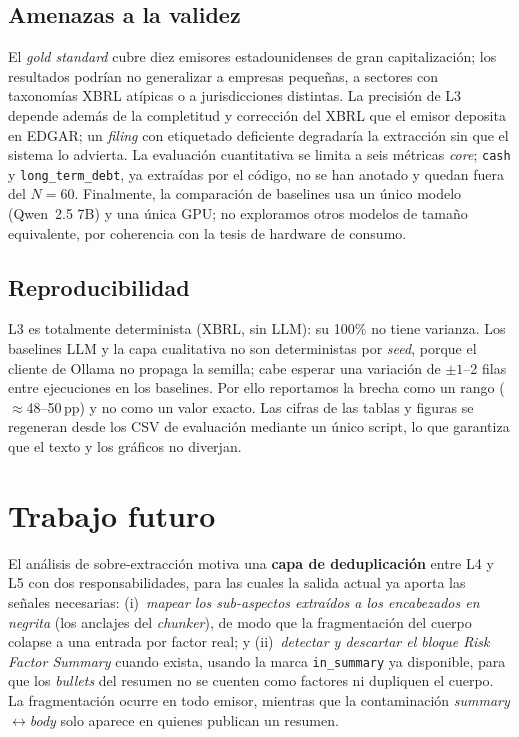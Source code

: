 \documentclass[conference]{IEEEtran}
\begin{document}
\subsection{Amenazas a la validez}
El \textit{gold standard} cubre diez emisores estadounidenses de gran
capitalización; los resultados podrían no generalizar a empresas pequeñas, a
sectores con taxonomías XBRL atípicas o a jurisdicciones distintas. La precisión
de L3 depende además de la completitud y corrección del XBRL que el emisor deposita
en EDGAR; un \textit{filing} con etiquetado deficiente degradaría la extracción sin
que el sistema lo advierta. La evaluación cuantitativa se limita a seis métricas
\textit{core}; \texttt{cash} y \texttt{long\_term\_debt}, ya extraídas por el
código, no se han anotado y quedan fuera del $N=60$. Finalmente, la comparación de
baselines usa un único modelo (Qwen~2.5 7B) y una única GPU; no exploramos otros
modelos de tamaño equivalente, por coherencia con la tesis de hardware de consumo.

\subsection{Reproducibilidad}
L3 es totalmente determinista (XBRL, sin LLM): su 100\% no tiene varianza. Los
baselines LLM y la capa cualitativa no son deterministas por \textit{seed},
porque el cliente de Ollama no propaga la semilla; cabe esperar una variación de
$\pm1$--2 filas entre ejecuciones en los baselines. Por ello reportamos la
brecha como un rango ($\approx$48--50\,pp) y no como un valor exacto. Las cifras
de las tablas y figuras se regeneran desde los CSV de evaluación mediante un
único script, lo que garantiza que el texto y los gráficos no diverjan.

\section{Trabajo futuro}
\label{sec:future}
El análisis de sobre-extracción motiva una \textbf{capa de deduplicación} entre
L4 y L5 con dos responsabilidades, para las cuales la salida actual ya aporta las
señales necesarias: (i)~\emph{mapear los sub-aspectos extraídos a los encabezados
en negrita} (los anclajes del \textit{chunker}), de modo que la fragmentación del
cuerpo colapse a una entrada por factor real; y (ii)~\emph{detectar y descartar el
bloque \textit{Risk Factor Summary}} cuando exista, usando la marca
\texttt{in\_summary} ya disponible, para que los \textit{bullets} del resumen no
se cuenten como factores ni dupliquen el cuerpo. La fragmentación ocurre en todo
emisor, mientras que la contaminación \textit{summary}$\leftrightarrow$\textit{body}
solo aparece en quienes publican un resumen.
\end{document}
